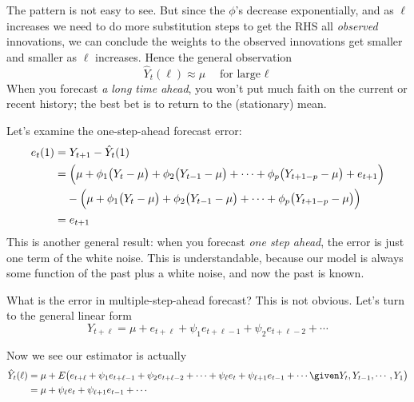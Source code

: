 \documentclass[12pt]{article}
\begin{document}
The pattern is not easy to see.
But since the $\phi$'s decrease exponentially,
and as $\ell$ increases we need to do more substitution steps to get the
RHS all \emph{observed} innovations,
we can conclude the weights to the observed innovations get smaller and
smaller as $\ell$ increases.
Hence the general observation
\begin{equation}\label{eq:Ytlhat-large-ell}
\hat{Y}_t(\ell) \approx \mu
\quad\text{for large $\ell$}
\end{equation}
When you forecast \emph{a long time ahead},
you won't put much faith on the current or recent history;
the best bet is to return to the (stationary) mean.

Let's examine the one-step-ahead forecast error:
\begin{equation}
\begin{split}
e_t(1)
&= Y_{t+1} - \hat{Y}_t(1)
\\
&= \Bigl(\mu
        + \phi_1 \bigl(Y_t - \mu\bigr)
        + \phi_2 \bigl(Y_{t-1} - \mu\bigr)
        +\dotsb
        + \phi_p \bigl(Y_{t+1-p} - \mu\bigr)
        + e_{t+1}
    \Bigr)
\\
&\phantom{\mathrel{=}\;}
    - \Bigl(
        \mu
        + \phi_1 \bigl(Y_t - \mu\bigr)
        + \phi_2 \bigl(Y_{t-1} - \mu\bigr)
        +\dotsb
        + \phi_p \bigl(Y_{t+1-p} - \mu\bigr)
        \Bigr)
\\
&= e_{t+1}
\end{split}
\end{equation}
This is another general result:
when you forecast \emph{one step ahead},
the error is just one term of the white noise.
This is understandable, because our model is always some function of the
past plus a white noise, and now the past is known.

What is the error in multiple-step-ahead forecast?
This is not obvious.
Let's turn to the general linear form
\begin{equation}\label{eq:psi-form}
Y_{t+\ell} = \mu + e_{t+\ell} + \psi_1 e_{t+\ell-1} + \psi_2 e_{t+\ell-2} + \dotsb
\end{equation}

Now we see our estimator is actually
\begin{equation}\label{eq:Ytlhat-psi}
\begin{split}
\hat{Y}_t(\ell)
&= \mu +
    E\bigl(e_{t+\ell} + \psi_1 e_{t+\ell-1} + \psi_2 e_{t+\ell-2}
    + \dotsb + \psi_\ell e_{t} + \psi_{\ell+1} e_{t-1} +\dotsb
    \given Y_t, Y_{t-1}, \dotsb, Y_1\bigr)
\\
&= \mu + \psi_\ell e_{t} + \psi_{\ell+1} e_{t-1} +\dotsb
\end{split}
\end{equation}
\end{document}
